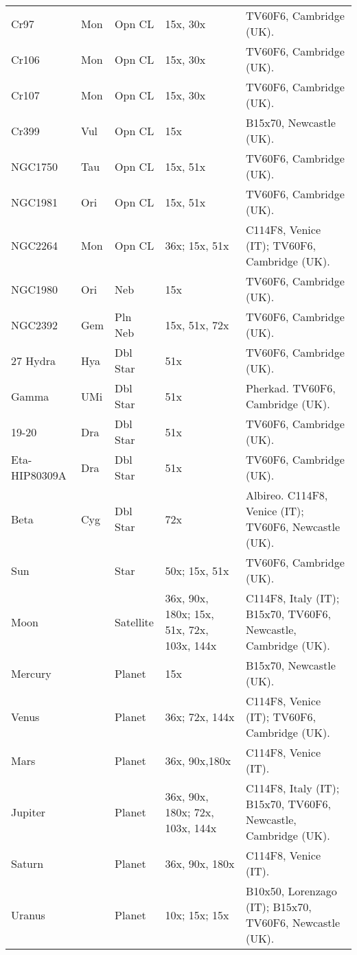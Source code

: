 \begin{longtable}{ p{0.7in}  p{0.3in}  p{0.6in}  p{0.9in}  p{5.8in} }
Cr97 & Mon & Opn CL & 15x, 30x & TV60F6, Cambridge (UK). \\ 
Cr106 & Mon & Opn CL & 15x, 30x & TV60F6, Cambridge (UK). \\ 
Cr107 & Mon & Opn CL & 15x, 30x & TV60F6, Cambridge (UK). \\ 
Cr399 & Vul & Opn CL & 15x & B15x70, Newcastle (UK). \\ 
NGC1750 & Tau & Opn CL & 15x, 51x & TV60F6, Cambridge (UK). \\ 
NGC1981 & Ori & Opn CL & 15x, 51x & TV60F6, Cambridge (UK). \\ 
NGC2264 & Mon & Opn CL & 36x; 15x, 51x & C114F8, Venice (IT); TV60F6, Cambridge (UK). \\ 
NGC1980 & Ori & Neb & 15x & TV60F6, Cambridge (UK). \\ 
NGC2392 & Gem & Pln Neb & 15x, 51x, 72x & TV60F6, Cambridge (UK). \\ 
27 Hydra & Hya & Dbl Star & 51x & TV60F6, Cambridge (UK). \\ 
Gamma & UMi & Dbl Star & 51x & Pherkad. TV60F6, Cambridge (UK). \\ 
19-20 & Dra & Dbl Star & 51x & TV60F6, Cambridge (UK). \\ 
Eta-HIP80309A & Dra & Dbl Star & 51x & TV60F6, Cambridge (UK). \\ 
Beta & Cyg & Dbl Star & 72x & Albireo. C114F8, Venice (IT); TV60F6, Newcastle (UK). \\ 
Sun &  & Star & 50x; 15x, 51x & TV60F6, Cambridge (UK). \\ 
Moon &  & Satellite & 36x, 90x, 180x; 15x, 51x, 72x, 103x, 144x & C114F8, Italy (IT); B15x70, TV60F6, Newcastle, Cambridge (UK). \\ 
Mercury &  & Planet & 15x & B15x70, Newcastle (UK). \\ 
Venus &  & Planet & 36x; 72x, 144x & C114F8, Venice (IT); TV60F6, Cambridge (UK). \\ 
Mars &  & Planet & 36x, 90x,180x & C114F8, Venice (IT). \\ 
Jupiter &  & Planet & 36x, 90x, 180x; 72x, 103x, 144x & C114F8, Italy (IT); B15x70, TV60F6, Newcastle, Cambridge (UK). \\ 
Saturn &  & Planet & 36x, 90x, 180x & C114F8, Venice (IT). \\ 
Uranus &  & Planet & 10x; 15x; 15x & B10x50, Lorenzago (IT); B15x70, TV60F6, Newcastle (UK). \\ 
\hline 
\end{longtable} 
